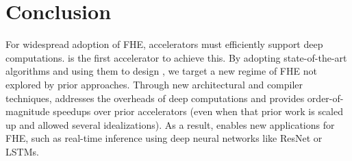 \section{Conclusion}\label{sec:conclusion}

For widespread adoption of FHE, accelerators must efficiently support deep computations.
\name is the first accelerator to achieve this.
By adopting state-of-the-art algorithms and using them to design \name,
we target a new regime of FHE not explored by prior approaches.
Through new architectural and compiler techniques, \name addresses the overheads
of deep computations and provides order-of-magnitude speedups over prior accelerators
(even when that prior work is scaled up and allowed several idealizations).
As a result, \name enables new applications for FHE, such as real-time inference
using deep neural networks like ResNet or LSTMs.


